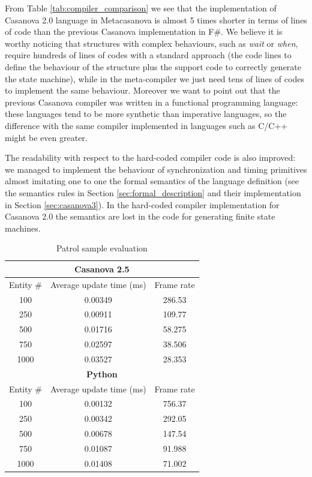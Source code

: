 From Table \ref{tab:compiler_comparison} we see that the implementation of Casanova 2.0 language in Metacasanova is almost 5 times shorter in terms of lines of code than the previous Casanova implementation in F\#. We believe it is worthy noticing that structures with complex behaviours, such as \textit{wait} or \textit{when}, require hundreds of lines of codes with a standard approach (the code lines to define the behaviour of the structure plus the support code to correctly generate the state machine), while in the meta-compiler we just need tens of lines of codes to implement the same behaviour. Moreover we want to point out that the previous Casanova compiler was written in a functional programming language: these languages tend to be more synthetic than imperative languages, so the difference with the same compiler implemented in languages such as C/C++ might be even greater.

The readability with respect to the hard-coded compiler code is also improved: we managed to implement the behaviour of synchronization and timing primitives almost imitating one to one the formal semantics of the language definition (see the semantics rules in Section \ref{sec:formal_description} and their implementation in Section \ref{sec:casanova3}). In the hard-coded compiler implementation for Casanova 2.0 the semantics are lost in the code for generating finite state machines.

\begin{table}[!h]
	\centering
	\tiny	
	\begin{tabular}{|c|c|c|}
		\hline
		\multicolumn{3}{|c|}{\textbf{Casanova 2.5}} \\
		\hline
		Entity \# & Average update time (ms) & Frame rate \\
		\hline
		100 & 0.00349 & 286.53 \\
		\hline
		250 & 0.00911 & 109.77 \\
		\hline
		500 & 0.01716 & 58.275 \\
		\hline
		750 & 0.02597 & 38.506 \\
		\hline
		1000 & 0.03527 & 28.353 \\
		\hline
		\multicolumn{3}{|c|}{\textbf{Python}} \\
		\hline
		Entity \# & Average update time (ms) & Frame rate \\
		\hline
		100 & 0.00132 & 756.37 \\
		\hline
		250 & 0.00342 & 292.05 \\
		\hline
		500 & 0.00678 & 147.54 \\
		\hline
		750 & 0.01087 & 91.988 \\
		\hline
		1000 & 0.01408 & 71.002 \\
		\hline
	\end{tabular}
	\caption{Patrol sample evaluation}
	\label{tab:evaluation}
\end{table}

